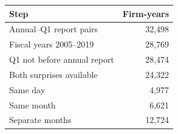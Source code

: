 \begin{tabular}{lr}
\toprule
Step & Firm-years\\
\midrule
Annual--Q1 report pairs & 32,498\\
Fiscal years 2005--2019 & 28,769\\
Q1 not before annual report & 28,474\\
Both surprises available & 24,322\\
\midrule
\quad Same day & 4,977\\
\quad Same month & 6,621\\
\quad Separate months & 12,724\\
\bottomrule
\end{tabular}